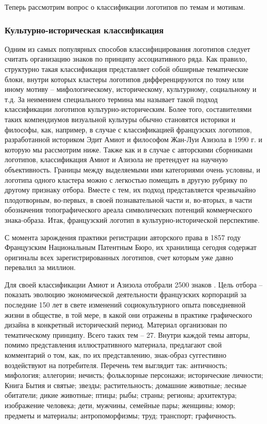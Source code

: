 Теперь рассмотрим вопрос о классификации логотипов по темам и мотивам.

\subsubsection{Культурно-историческая классификация}
\label{2.3}

Одним из самых популярных способов классифицирования логотипов следует считать
организацию знаков по принципу ассоциативного ряда. Как правило, структурно
такая классификация представляет собой обширные тематические блоки,
внутри которых кластеры логотипов дифференцируются по тому или иному мотиву --
мифологическому, историческому, культурному, социальному и т.д. За неимением
специального термина мы называет такой подход классификации логотипов
культурно-историческим. Более того, составителями таких компендиумов визуальной
культуры обычно становятся историки и философы, как, например, в случае с
классификацией французских логотипов, разработанной историком Эдит Амиот и
философом Жан-Луи Азизола в 1990 г. и которую мы рассмотрим ниже. Также как
и в случае с авторскими сборниками логотипов, классификация Амиот и Азизола
не претендует на научную объективность. Границы между выделяемыми ими категориями
очень условны, и логотипа одного кластера можно с легкостью помещать в
другую рубрику по другому признаку отбора. Вместе с тем, их подход представляется
чрезвычайно плодотворным, во-первых, в своей познавательной части и, во-вторых,
в части обозначения топографического ареала символических потенций коммерческого
знака-образа. Итак, французский логотип в культурно-исторической перспективе.

С момента зарождения практики регистрации авторского права в 1857 году
Французским Национальным Патентным Бюро, их хранилища сегодня содержат
оригиналы всех зарегистрированных логотипов, счет которым уже давно перевалил
за миллион.

Для своей классификации Амиот и Азизола отобрали 2500
знаков \autocite{edithjeanluois}. Цель отбора --
показать эволюцию экономической деятельности французских корпораций за последние
150 лет в свете изменений социокультурного опыта повседневной жизни в обществе,
в той мере, в какой они отражены в практике графического дизайна в конкретный
исторический период. Материал организован по тематическому принципу. Всего таких
тем -- 27. Внутри каждой темы авторы, помимо представления иллюстративного
материала, предлагают свой комментарий о том, как, по их представлению,
знак-образ суггестивно воздействуют на потребителя. Перечень тем выглядит так:
античность; мифология; аллегории; нечисть; фольклорные персонажи; исторические
личности; Книга Бытия и святые; звезды; растительность; домашние животные;
лесные обитатели; дикие животные; птицы; рыбы; страны; регионы; архитектура;
изображение человека; дети, мужчины, семейные пары; женщины; юмор; предметы и
материалы; антропоморфизмы; труд; транспорт; графичность.

